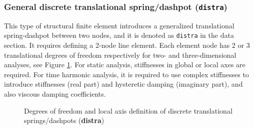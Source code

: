 \documentclass[a4paper,fleqn]{book}
\begin{document}
\subsubsection{General discrete translational spring/dashpot (\texttt{distra})}

This type of structural finite element introduces a generalized translational spring-dashpot between two nodes, and it is denoted as \texttt{distra} in the data section. It requires defining a 2-node line element. Each element node has 2 or 3 translational degrees of freedom respectively for two- and three-dimensional analyses, see Figure \ref{fig:distra}. For static analysis, stiffnesses in global or local axes are required. For time harmonic analysis, it is required to use complex stiffnesses to introduce stiffnesses (real part) and hysteretic damping (imaginary part), and also viscous damping coefficients.

\begin{figure}[h]

\caption{Degrees of freedom and local axis definition of discrete translational springs/dashpots (\textbf{distra})}
\label{fig:distra}
\end{figure}
\end{document}

